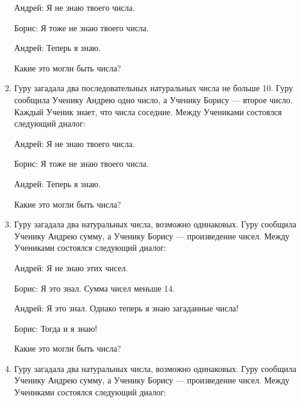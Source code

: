 \documentclass[12pt]{article}
\theoremstyle{definition}
\begin{document}
\begin{enumerate}
Андрей: Я не знаю твоего числа.

Борис: Я тоже не знаю твоего числа.

Андрей: Теперь я знаю.

Какие это могли быть числа?

\item Гуру загадала два последовательных натуральных числа не больше 10. 
Гуру сообщила Ученику Андрею одно число, а Ученику Борису — второе число. 
Каждый Ученик знает, что числа соседние. Между Учениками состоялся следующий диалог:

Андрей: Я не знаю твоего числа.

Борис: Я тоже не знаю твоего числа.

Андрей: Теперь я знаю.

Какие это могли быть числа?



\begin{comment}
\item Альберт и Бернард только что познакомились с Шерил. Они хотят знать, когда у неё день рождения. 
Шерил предложила им десять возможных дат: 15 мая, 16 мая, 19 мая, 17 июня, 18 июня, 14 июля, 16 июля, 14 августа, 15 августа и 17 августа. 
Затем Шерил сказала Альберту месяц своего рождения, а Бернарду — день. После этого состоялся диалог.

Альберт: Я не знаю, когда у Шерил день рождения, но я знаю, что Бернард тоже не знает.

Бернард: Поначалу я не знал, когда у Шерил день рождения, но знаю теперь.

Альберт: Теперь я тоже знаю, когда у Шерил день рождения. 

Когда у Шерил день рождения?
\end{comment}


\item Гуру загадала два натуральных числа, возможно одинаковых. 
Гуру сообщила Ученику Андрею сумму, а Ученику Борису — произведение чисел. 
Между Учениками состоялся следующий диалог:

Андрей: Я не знаю этих чисел.

Борис: Я это знал. Сумма чисел меньше 14. 

Андрей: Я это знал. Однако теперь я знаю загаданные числа!

Борис: Тогда и я знаю!

Какие это могли быть числа?


\item Гуру загадала два натуральных числа, возможно одинаковых. 
Гуру сообщила Ученику Андрею сумму, а Ученику Борису — произведение чисел. 
Между Учениками состоялся следующий диалог:


\end{enumerate}
\end{document}
